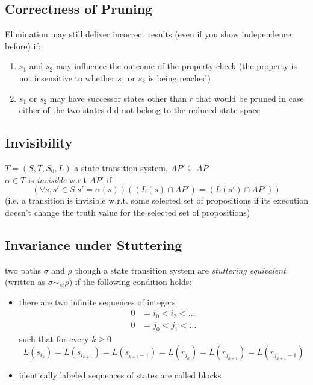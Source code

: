 \documentclass[a4paper, 10pt]{article}
\begin{document}
\subsection*{Correctness of Pruning}
Elimination may still deliver incorrect results (even if you show independence before) if:
\begin{enumerate}
    \item $s_1$ and $s_2$ may influence the outcome of the property check {\tiny (the property is not insensitive to whether $s_1$ or $s_2$ is being reached)}
    \item $s_1$ or $s_2$ may have successor states other than $r$ that would be pruned in case either of the two states did not belong to the reduced state space
\end{enumerate}
\subsection*{Invisibility}
\begin{shaded}
    $T=(S,T,S_0,L)$ a state transition system, $AP'\subseteq AP$ \\
    $\alpha\in T$ is \emph{invisible} w.r.t $AP'$ if
    \[ (\forall s,s'\in S| s'=\alpha(s))((L(s)\cap AP')=(L(s')\cap AP')) \]
    {\tiny (i.e. a transition is invisible w.r.t. some selected set of propositions if its execution doesn't change the truth value for the selected set of propositions)}
\end{shaded}
\subsection*{Invariance under Stuttering}
\begin{shaded}
    two paths $\sigma$ and $\rho$ though a state transition system are \emph{stuttering equivalent} (written as $\sigma\sim_{st}\rho$) if the following condition holds:
    \begin{itemize}
        \item there are two infinite sequences of integers
        \begin{align*}
        0&=i_0<i_2<\dots \\
        0&=j_0<j_1<\dots
        \end{align*}
        such that for every $k\geq0$
        \[ L(s_{i_k})=L(s_{i_{k+1}})=L(s_{_{k+1}-1})=L(r_{j_k})=L(r_{j_{k+1}})=L(r_{j_{k+1}-1}) \]
        \item identically labeled sequences of states are called blocks
        \begin{center}
        \scalebox{1}{}
        \end{center}
    \end{itemize}
\end{shaded}
\end{document}
